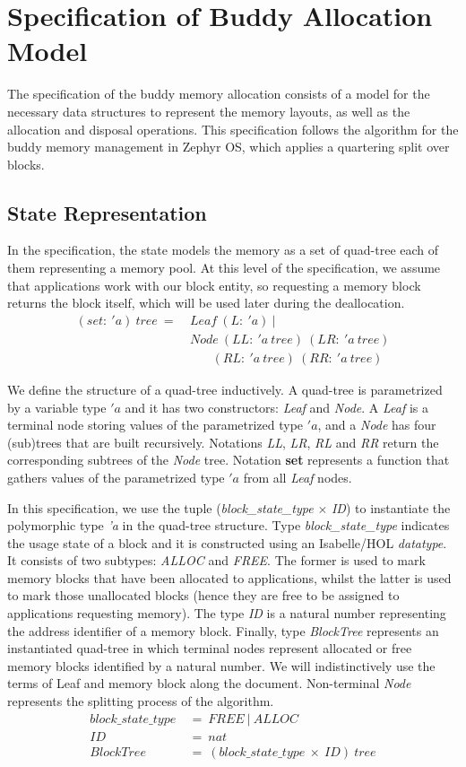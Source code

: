 \section{Specification of Buddy Allocation Model}\label{sec:spec}
The specification of the buddy memory allocation consists of a model for the necessary data structures to represent the memory layouts, as well as the allocation and disposal operations. This specification follows the algorithm for the buddy memory management in Zephyr OS, which applies a quartering split over blocks.

\subsection{State Representation}\label{statedes}
In the specification, the state models the memory as a set of quad-tree each of them representing a memory pool. At this level of the specification, we assume that applications work with our block entity, so requesting a memory block returns the block itself, which will be used later during the deallocation.
\begin{align*}
(set:\ 'a)\ tree\ =\ &Leaf\ (L:\ 'a)\ | \\
&Node\ (LL:\ 'a\ tree)\ (LR:\ 'a\ tree)\\
&\ \ \ \ \ \ \ \ (RL:\ 'a\ tree)\ (RR:\ 'a\ tree)
\end{align*}

We define the structure of a quad-tree inductively. A quad-tree is parametrized by a variable type $'a$ and it has two constructors: \emph{Leaf} and \emph{Node}. A \emph{Leaf} is a terminal node storing values of the parametrized type $'a$, and a \emph{Node} has four (sub)trees that are built recursively. Notations \emph{LL}, \emph{LR}, \emph{RL} and \emph{RR} return the corresponding subtrees of the \emph{Node} tree. Notation \textbf{set} represents a function that gathers values of the parametrized type $'a$ from all \emph{Leaf} nodes.

In this specification, we use the tuple (\emph{block\_state\_type} $\times$ \emph{ID}) to instantiate the polymorphic type \emph{'a} in the quad-tree structure. Type \emph{block\_state\_type} indicates the usage state of a block and it is constructed using an Isabelle/HOL \emph{datatype}. It consists of two subtypes: \emph{ALLOC} and \emph{FREE}. The former is used to mark memory blocks that have been allocated to applications, whilst the latter is used to mark those unallocated blocks (hence they are free to be assigned to applications requesting memory). The type \emph{ID} is a natural number representing the address identifier of a memory block. Finally, type \emph{BlockTree} represents an instantiated quad-tree in which terminal nodes represent allocated or free memory blocks identified by a natural number. We will indistinctively use the terms of Leaf and memory block along the document. Non-terminal \emph{Node} represents the splitting process of the algorithm.
\begin{align*}
block\_state\_type\ &=\ FREE\ |\ ALLOC \\
ID\ &=\ nat \\
BlockTree\ &=\ (block\_state\_type\ \times\ ID)\ tree
\end{align*}

